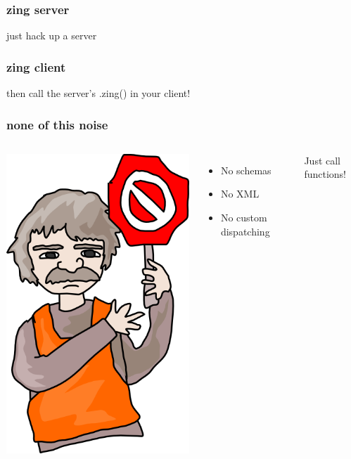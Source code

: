 \documentclass{beamer}
\begin{document}
\begin{frame}
\frametitle{zing server}

\huge
just hack up a server
\newline

\normalsize
\fbox{
    
}

\end{frame}

\begin{frame}
\frametitle{zing client}

\huge
then call the server's .zing() in your client!
\newline

\normalsize
\fbox{
    
}
\end{frame}

\begin{frame}
    \frametitle{none of this noise}
    
    \begin{columns}[c]
        \includegraphics[scale=0.4]{images/no.png}
        \huge
        \begin{itemize}
            \item No schemas
            \item No XML
            \item No custom dispatching
        \end{itemize}
        \pause
        Just call functions!
    \end{columns}
\end{frame}
\end{document}
